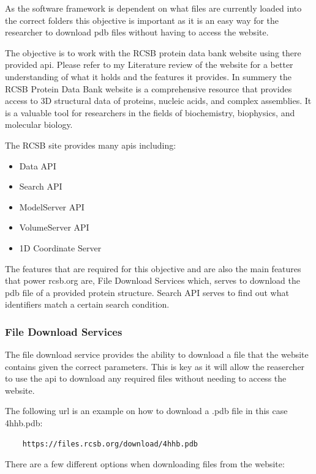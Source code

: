 \documentclass[]{final_report}
\begin{document}
As the software framework is dependent on what files are currently loaded into the correct folders this objective is important as it is an easy way for the researcher to download pdb files without having to access the website.

The objective is to work with the RCSB protein data bank website using there provided api. Please refer to my Literature review of the website for a better understanding of what it holds and the features it provides. In summery the RCSB Protein Data Bank website is a comprehensive resource that provides access to 3D structural data of proteins, nucleic acids, and complex assemblies. It is a valuable tool for researchers in the fields of biochemistry, biophysics, and molecular biology.

The RCSB site provides many apis including:
\begin{itemize}
    \item Data API
    \item Search API
    \item ModelServer API
    \item VolumeServer API
    \item 1D Coordinate Server
\end{itemize}

The features that are required for this objective and are also the main features that power rcsb.org are, File Download Services which, serves to download the pdb file of a provided protein structure. Search API serves to find out what identifiers match a certain search condition.

\subsubsection{File Download Services}

The file download service provides the ability to download a file that the website contains given the correct parameters. This is key as it will allow the reasercher to use the api to download any required files without needing to access the website. 

The following url is an example on how to download a .pdb file in this case 4hhb.pdb:

\begin{lstlisting}
    https://files.rcsb.org/download/4hhb.pdb
\end{lstlisting}

There are a few different options when downloading files from the website:
\end{document}
